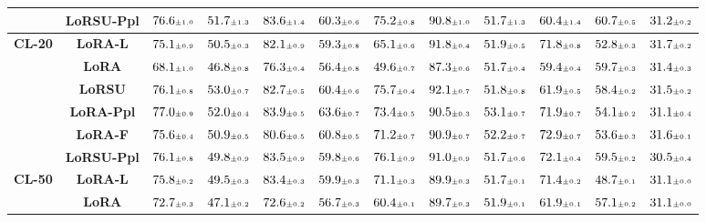 \begin{table}
\begin{center}
\begin{small}
\begin{tabular}{l c c c c c c c c c c c}
& \textbf{LoRSU-Ppl} & $76.6 \mtiny{\pm 1.0}$ & $51.7 \mtiny{\pm 1.3}$ & $83.6 \mtiny{\pm 1.4}$ & $60.3 \mtiny{\pm 0.6}$ & $75.2 \mtiny{\pm 0.8}$ & $90.8 \mtiny{\pm 1.0}$ & $51.7 \mtiny{\pm 1.3}$ & $60.4 \mtiny{\pm 1.4}$ & $60.7 \mtiny{\pm 0.5}$ & $31.2 \mtiny{\pm 0.2}$ \\
\midrule
\multirow{6}{*}{\textbf{CL-20}} & \textbf{LoRA-L} & $75.1 \mtiny{\pm 0.9}$ & $50.5 \mtiny{\pm 0.3}$ & $82.1 \mtiny{\pm 0.9}$ & $59.3 \mtiny{\pm 0.8}$ & $65.1 \mtiny{\pm 0.6}$ & $91.8 \mtiny{\pm 0.4}$ & $51.9 \mtiny{\pm 0.5}$ & $71.8 \mtiny{\pm 0.8}$ & $52.8 \mtiny{\pm 0.3}$ & $31.7 \mtiny{\pm 0.2}$ \\
& \textbf{LoRA} & $68.1 \mtiny{\pm 1.0}$ & $46.8 \mtiny{\pm 0.8}$ & $76.3 \mtiny{\pm 0.4}$ & $56.4 \mtiny{\pm 0.8}$ & $49.6 \mtiny{\pm 0.7}$ & $87.3 \mtiny{\pm 0.6}$ & $51.7 \mtiny{\pm 0.4}$ & $59.4 \mtiny{\pm 0.4}$ & $59.7 \mtiny{\pm 0.3}$ & $31.4 \mtiny{\pm 0.3}$ \\
& \textbf{LoRSU} & $76.1 \mtiny{\pm 0.8}$ & $53.0 \mtiny{\pm 0.7}$ & $82.7 \mtiny{\pm 0.5}$ & $60.4 \mtiny{\pm 0.6}$ & $75.7 \mtiny{\pm 0.4}$ & $92.1 \mtiny{\pm 0.7}$ & $51.8 \mtiny{\pm 0.8}$ & $61.9 \mtiny{\pm 0.5}$ & $58.4 \mtiny{\pm 0.2}$ & $31.5 \mtiny{\pm 0.2}$ \\
& \textbf{LoRA-Ppl} & $77.0 \mtiny{\pm 0.9}$ & $52.0 \mtiny{\pm 0.4}$ & $83.9 \mtiny{\pm 0.5}$ & $63.6 \mtiny{\pm 0.7}$ & $73.4 \mtiny{\pm 0.5}$ & $90.5 \mtiny{\pm 0.3}$ & $53.1 \mtiny{\pm 0.7}$ & $71.9 \mtiny{\pm 0.7}$ & $54.1 \mtiny{\pm 0.2}$ & $31.1 \mtiny{\pm 0.4}$ \\
& \textbf{LoRA-F} & $75.6 \mtiny{\pm 0.4}$ & $50.9 \mtiny{\pm 0.5}$ & $80.6 \mtiny{\pm 0.5}$ & $60.8 \mtiny{\pm 0.5}$ & $71.2 \mtiny{\pm 0.7}$ & $90.9 \mtiny{\pm 0.7}$ & $52.2 \mtiny{\pm 0.7}$ & $72.9 \mtiny{\pm 0.7}$ & $53.6 \mtiny{\pm 0.3}$ & $31.6 \mtiny{\pm 0.1}$ \\
& \textbf{LoRSU-Ppl} & $76.1 \mtiny{\pm 0.8}$ & $49.8 \mtiny{\pm 0.9}$ & $83.5 \mtiny{\pm 0.9}$ & $59.8 \mtiny{\pm 0.6}$ & $76.1 \mtiny{\pm 0.9}$ & $91.0 \mtiny{\pm 0.9}$ & $51.7 \mtiny{\pm 0.6}$ & $72.1 \mtiny{\pm 0.4}$ & $59.5 \mtiny{\pm 0.2}$ & $30.5 \mtiny{\pm 0.4}$ \\
\midrule
\multirow{6}{*}{\textbf{CL-50}} & \textbf{LoRA-L} & $75.8 \mtiny{\pm 0.2}$ & $49.5 \mtiny{\pm 0.3}$ & $83.4 \mtiny{\pm 0.3}$ & $59.9 \mtiny{\pm 0.3}$ & $71.1 \mtiny{\pm 0.3}$ & $89.9 \mtiny{\pm 0.3}$ & $51.7 \mtiny{\pm 0.1}$ & $71.4 \mtiny{\pm 0.2}$ & $48.7 \mtiny{\pm 0.1}$ & $31.1 \mtiny{\pm 0.0}$ \\
& \textbf{LoRA} & $72.7 \mtiny{\pm 0.3}$ & $47.1 \mtiny{\pm 0.2}$ & $72.6 \mtiny{\pm 0.2}$ & $56.7 \mtiny{\pm 0.3}$ & $60.4 \mtiny{\pm 0.1}$ & $89.7 \mtiny{\pm 0.3}$ & $51.9 \mtiny{\pm 0.1}$ & $61.9 \mtiny{\pm 0.1}$ & $57.1 \mtiny{\pm 0.2}$ & $31.1 \mtiny{\pm 0.0}$ \\

\end{tabular}
\end{small}
\end{center}
\end{table}
